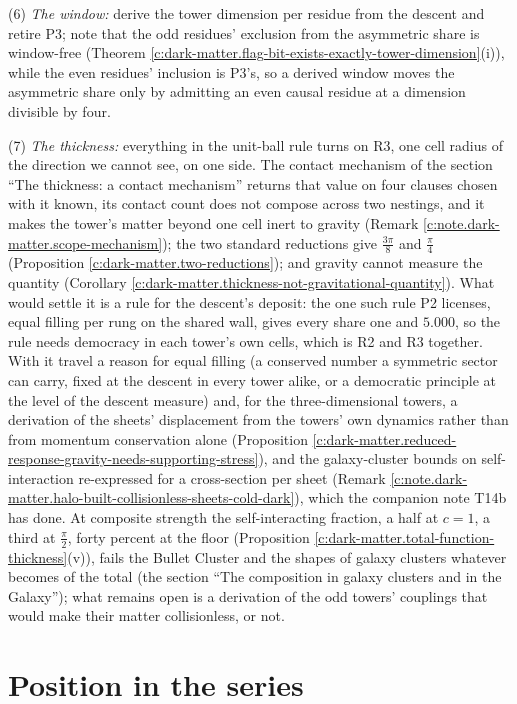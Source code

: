 \documentclass[11pt]{article}
\theoremstyle{definition}
\theoremstyle{plain}
\begin{document}
(6) \emph{The window:} derive the tower dimension per residue from the descent and retire P3; note that the odd residues' exclusion from the asymmetric share is window-free (Theorem \ref{c:dark-matter.flag-bit-exists-exactly-tower-dimension}(i)), while the even residues' inclusion is P3's, so a derived window moves the asymmetric share only by admitting an even causal residue at a dimension divisible by four.

(7) \emph{The thickness:} everything in the unit-ball rule turns on R3, one cell radius of the direction we cannot see, on one side. The contact mechanism of the section ``The thickness: a contact mechanism'' returns that value on four clauses chosen with it known, its contact count does not compose across two nestings, and it makes the tower's matter beyond one cell inert to gravity (Remark \ref{c:note.dark-matter.scope-mechanism}); the two standard reductions give $\tfrac{3\pi}{8}$ and $\tfrac{\pi}{4}$ (Proposition \ref{c:dark-matter.two-reductions}); and gravity cannot measure the quantity (Corollary \ref{c:dark-matter.thickness-not-gravitational-quantity}). What would settle it is a rule for the descent's deposit: the one such rule P2 licenses, equal filling per rung on the shared wall, gives every share one and $5.000$, so the rule needs democracy in each tower's own cells, which is R2 and R3 together. With it travel a reason for equal filling (a conserved number a symmetric sector can carry, fixed at the descent in every tower alike, or a democratic principle at the level of the descent measure) and, for the three-dimensional towers, a derivation of the sheets' displacement from the towers' own dynamics rather than from momentum conservation alone (Proposition \ref{c:dark-matter.reduced-response-gravity-needs-supporting-stress}), and the galaxy-cluster bounds on self-interaction re-expressed for a cross-section per sheet (Remark \ref{c:note.dark-matter.halo-built-collisionless-sheets-cold-dark}), which the companion note T14b has done. At composite strength the self-interacting fraction, a half at $c = 1$, a third at $\tfrac{\pi}{2}$, forty percent at the floor (Proposition \ref{c:dark-matter.total-function-thickness}(v)), fails the Bullet Cluster and the shapes of galaxy clusters whatever becomes of the total (the section ``The composition in galaxy clusters and in the Galaxy''); what remains open is a derivation of the odd towers' couplings that would make their matter collisionless, or not.

\section{Position in the series}
\end{document}
